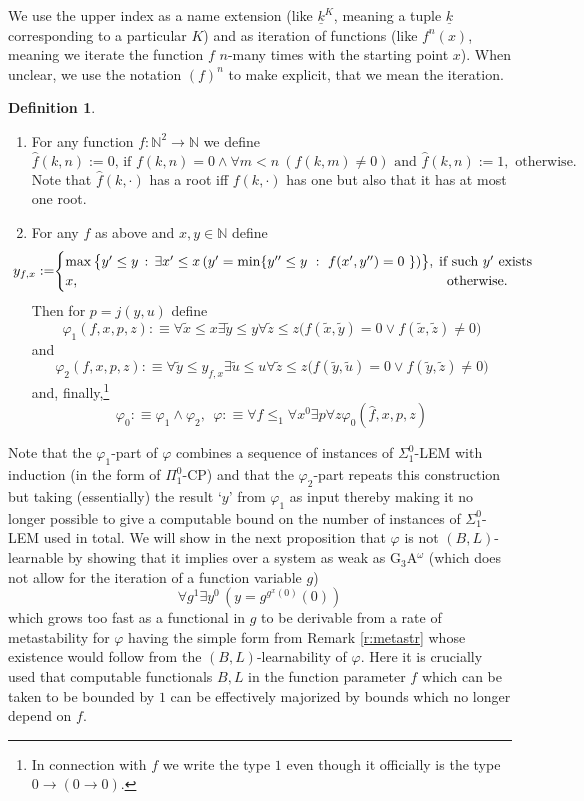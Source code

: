 \documentclass[1p]{elsarticle}
\newcommand{\NN}{\ensuremath{\mathbb{N}}}
\newcommand{\tup}{\underline} %
\newcommand{\Telse}{\text{otherwise}}
\theoremstyle{plain}
\theoremstyle{definition}
\newtheorem{dfn}[thm]{Definition}
\theoremstyle{remark}
\renewcommand{\phi}{\varphi}
\theoremstyle{definition}
\begin{document}
{We use the upper index as a name extension (like $\tup k^K$, meaning a tuple $\tup k$ corresponding to a particular $K$) and as iteration of functions (like $f^n(x)$, meaning we iterate the function $f$ $n$-many times with the starting point $x$). When unclear, we use the notation $(f)^n$ to make explicit, that we mean the iteration.


\begin{dfn}\
\begin{enumerate}
\item
For any function $f:\NN^2\to \NN$ we define \[ 
\mbox{$\widehat{f}(k,n):=0$, 
if $f(k,n)=0\wedge\forall m<n\ (f(k,m)\neq 0)$ and $\widehat{f}(k,n):=1,$ 
otherwise.}\] Note that $\widehat{f}(k,\cdot)$ has a root iff $f(k,\cdot)$ has 
one but also that it has at most one root.
\item 
For any $f$ as above and $x,y\in\NN$ define
\[ \hspace*{-5mm}
y_{f,x}:=\hspace*{-1mm}\begin{cases}
\max\big\{y'\leq y\, :\, \exists x'\le x\,
(y'=\min\{y''\leq y\ :\ f(x',y'')=0
\ \})\big\},& \hspace*{-2mm} \text{if such $y'$ exists}\\
x,&\Telse.
\end{cases}
\]
Then for $p=j(y,u)$ define 
\[ \varphi_1(f,x,p,z): \equiv
\forall \tilde x \leq x \exists \tilde y\leq y \forall \tilde z\leq z 
\big(f(\tilde x,\tilde y)=0\vee f(\tilde x,\tilde z)\neq0\big) \] 
and 
\[ \varphi_2(f,x,p,z):\equiv 
\forall \tilde y \leq y_{f,x} \exists \tilde u\leq u \forall \tilde z\leq z 
\big(f(\tilde y,\tilde u)=0\vee f(\tilde y,\tilde z)\neq0\big) \] 
and, finally,\footnote{In connection with $f$ we write the type $1$ even 
though it officially is the type $0\to (0\to 0).$} 
\[ \varphi_0:\equiv \varphi_1\wedge\varphi_2, \ \ \varphi:\equiv
\forall f\leq_1  \forall x^0 \exists p  \forall z \phi_0 
(\widehat{f},x,p,z)
\]
\end{enumerate}
\end{dfn}
Note that the $\varphi_1$-part of $\varphi$ combines a sequence of instances 
of $\Sigma^0_1$-LEM with induction (in the form of $\Pi^0_1$-CP) and that the 
$\varphi_2$-part repeats this construction but taking (essentially) the result 
`$y$' from $\varphi_1$ as input thereby making it no longer possible to give 
a computable bound on the number of instances of $\Sigma^0_1$-LEM used in 
total. We 
will show in the next proposition that $\varphi$ is not $(B,L)$-learnable 
by showing that it implies over a system as weak as 
G$_3$A$^{\omega}$ (which does not allow for the iteration of a function 
variable $g$) 
\[ \forall g^1\exists y^0 \,(y=g^{g^x(0)}(0)) \] 
which grows too fast as a functional in $g$ to be derivable from a rate 
of metastability for $\varphi$ having the simple form from Remark 
\ref{r:metastr} whose existence would follow from the $(B,L)$-learnability 
of $\varphi.$  
Here it is crucially used that computable functionals $B,L$ in the function 
parameter $f$ which can be taken to be bounded by $1$ can be effectively 
majorized by bounds which no longer depend on $f.$

}
\end{document}
